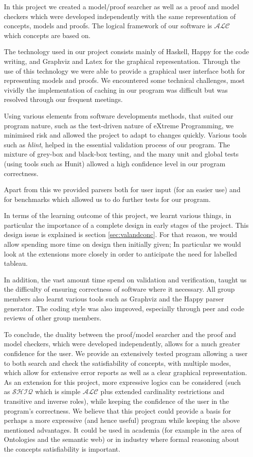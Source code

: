 In this project we created a model/proof searcher as well as a proof and model checkers which were developed independently with the same representation of concepts, models and proofs. The logical framework of our software is $\mathcal{ALC}$ which concepts are based on. 

The technology used in our project consists mainly of Haskell, Happy for the code writing, and Graphviz and Latex for the graphical representation. Through the use of this technology we were able to provide a graphical user interface both for representing models and proofs. We encountered some technical challenges, most vividly the implementation of caching in our program was difficult but was resolved through our frequent meetings.

Using various elements from software developments methods, that suited our program nature, such as the test-driven nature of eXtreme Programming, we minimised risk and allowed the project to adapt to changes quickly. Various tools such as \emph{hlint}, helped in the essential validation process of our program. The mixture of grey-box and black-box testing, and the many unit and global tests (using tools such as Hunit) allowed a high confidence level in our program correctness. 

Apart from this we provided parsers both for user input (for an easier use) and for benchmarks which allowed us to do further tests for our program.

In terms of the learning outcome of this project, we learnt various things, in particular the importance of a complete design in early stages of the project. This design issue is explained is section \ref{sec:valandconc}. For that reason, we would allow spending more time on design then initially given; In particular we would look at the extensions more closely in order to anticipate the need for labelled tableau.

In addition, the vast amount time spend on validation and verification, taught us the difficulty of ensuring correctness of software where it necessary. All group members also learnt various tools such as Graphviz and the Happy parser generator. The coding style was also improved, especially through peer and code reviews of other group members. 

To conclude, the duality between the proof/model searcher and the proof and model checkers, which were developed independently, allows for a much greater confidence for the user. We provide an extensively tested program allowing a user to both search and check the satisfiability of concepts, with multiple modes, which allow for extensive error reports as well as a clear graphical representation. As an extension for this project, more expressive logics can be considered (such as $\mathcal{SHIQ}$ which is simple $\mathcal{ALC}$ plus extended cardinality restrictions and transitive and inverse roles), while keeping the confidence of the user in the program's correctness. We believe that this project could provide a basis for perhaps a more expressive (and hence useful) program while keeping the above mentioned advantages. It could be used in academia (for example in the area of Ontologies and the semantic web) or in industry where formal reasoning about the concepts satisfiability is important. 
